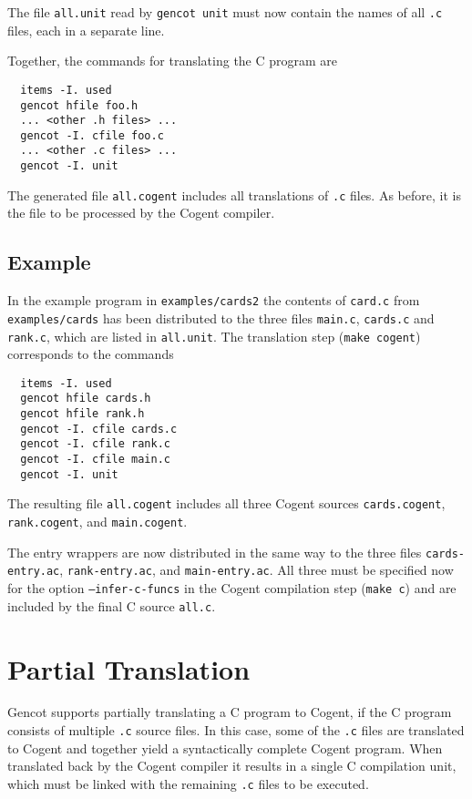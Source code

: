 \documentclass[a4paper]{report}
\newcommand{\code}[1]{\textnormal{\texttt{#1}}}
\begin{document}
The file \code{all.unit} read by \code{gencot unit} must now contain the names of all \code{.c} files, each in a 
separate line.

Together, the commands for translating the C program are
\begin{verbatim}
  items -I. used
  gencot hfile foo.h
  ... <other .h files> ...
  gencot -I. cfile foo.c
  ... <other .c files> ...
  gencot -I. unit
\end{verbatim}
The generated file \code{all.cogent} includes all translations of \code{.c} files. As before, it is the 
file to be processed by the Cogent compiler.

\subsection{Example}

In the example program in \code{examples/cards2} the contents of \code{card.c} from \code{examples/cards} has been 
distributed to the three files \code{main.c}, \code{cards.c} and \code{rank.c}, which are listed in \code{all.unit}.
The translation step (\code{make cogent}) corresponds to the commands
\begin{verbatim}
  items -I. used
  gencot hfile cards.h
  gencot hfile rank.h
  gencot -I. cfile cards.c
  gencot -I. cfile rank.c
  gencot -I. cfile main.c
  gencot -I. unit
\end{verbatim}
The resulting file \code{all.cogent} includes all three Cogent sources \code{cards.cogent}, \code{rank.cogent}, and
\code{main.cogent}.

The entry wrappers are now distributed in the same way to the three files \code{cards-entry.ac}, \code{rank-entry.ac},
and \code{main-entry.ac}. All three must be specified now for the option
\code{--infer-c-funcs} in the Cogent compilation step (\code{make c}) and are included by the final C source
\code{all.c}.

\section{Partial Translation}
\label{struct-partial}

Gencot supports partially translating a C program to Cogent, if the C program consists of multiple \code{.c} source
files. In this case, some of the \code{.c} files are translated to Cogent and together yield a syntactically complete 
Cogent program. When translated back by the Cogent compiler it results in a single C compilation unit, which must be
linked with the remaining \code{.c} files to be executed.
\end{document}
